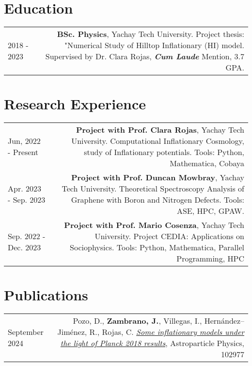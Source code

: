 \documentclass{article}
\begin{document}
\section*{Education}
\begin{tabular}{L!{\vrule}R}
	2018 - 2023 & \textbf{BSc. Physics}, Yachay Tech University. Project thesis: "Numerical Study of Hilltop Inflationary (HI) model. Supervised by Dr. Clara Rojas, \textbf{\textit{Cum Laude}} Mention, 3.7 GPA. \\
\end{tabular}

\section*{Research Experience}

\begin{tabular}{L!{\vrule}R}
    Jun, 2022 - Present   & \textbf{Project with Prof. Clara Rojas},  Yachay Tech University. Computational Inflationary Cosmology, study of Inflationary potentials. Tools: Python, Mathematica, Cobaya\\
    Apr. 2023 - Sep. 2023 & \textbf{Project with Prof. Duncan Mowbray}, Yachay Tech University. Theoretical Spectroscopy Analysis of Graphene with Boron and Nitrogen Defects. Tools: ASE, HPC, GPAW.\\
    Sep. 2022 - Dec. 2023 & \textbf{Project with Prof. Mario Cosenza}, Yachay Tech University. Project CEDIA: Applications on Sociophysics. Tools: Python, Mathematica, Parallel Programming, HPC  \\
    
\end{tabular}


\section*{Publications}

\begin{tabular}{L!{\vrule}R}
    September 2024 & 
    Pozo, D., \textbf{Zambrano, J.}, Villegas, I., Hernández–Jiménez, R., Rojas, C.
    \href{https://ui.adsabs.harvard.edu/abs/2024APh...16102977P/}{\textit{Some inflationary models under the light of Planck 2018 results}},
    Astroparticle Physics, 102977 \\
\end{tabular}
\end{document}
